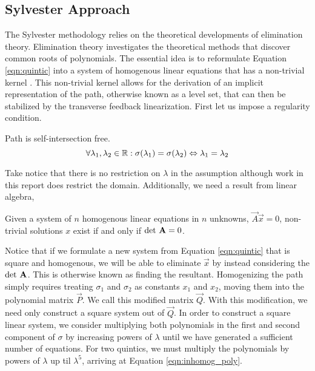 \documentclass[oneside, 11pt]{book}
\begin{document}
\subsection{Sylvester Approach}
The Sylvester methodology relies on the theoretical developments of elimination theory. Elimination theory investigates the theoretical methods that discover common roots of polynomials. The essential idea is to reformulate Equation \ref{eqn:quintic} into a system of homogenous linear equations that has a non-trivial kernel \cite{Sederberg84}. This non-trivial kernel allows for the derivation of an implicit representation of the path, otherwise known as a level set, that can then be stabilized by the transverse feedback linearization. First let us impose a regularity condition.

\begin{assumption}
    Path is self-intersection free.
    \begin{equation*}
        \forall \lambda_1, \lambda_2 \in\mathbb{R} : \sigma(\lambda_1) = \sigma(\lambda_2) \Leftrightarrow \lambda_1 = \lambda_2
    \end{equation*}
    \label{ass:self_intersect}
\end{assumption}

Take notice that there is no restriction on $\lambda$ in the assumption although work in this report does restrict the domain. Additionally, we need a result from linear algebra,

\begin{theorem}
    Given a system of $n$ homogenous linear equations in $n$ unknowns, $\vec{A}\vec{x}=0$, non-trivial solutions $x$ exist if and only if $\text{det}~\mathbf{A}=0$. \label{thm:kernel}
\end{theorem}

Notice that if we formulate a new system from Equation \ref{eqn:quintic} that is square and homogenous, we will be able to eliminate $\vec{x}$ by instead considering the $\text{det}~\mathbf{A}$. This is otherwise known as finding the resultant. Homogenizing the path simply requires treating $\sigma_1$ and $\sigma_2$ as constants $x_1$ and $x_2$, moving them into the polynomial matrix $\vec{P}$. We call this modified matrix $\vec{Q}$. With this modification, we need only construct a square system out of $\vec{Q}$. In order to construct a square linear system, we consider multiplying both polynomials in the first and second component of $\sigma$ by increasing powers of $\lambda$ until we have generated a sufficient number of equations. For two quintics, we must multiply the polynomials by powers of $\lambda$ up til $\lambda^5$, arriving at Equation \ref{eqn:inhomog_poly}.
\end{document}
